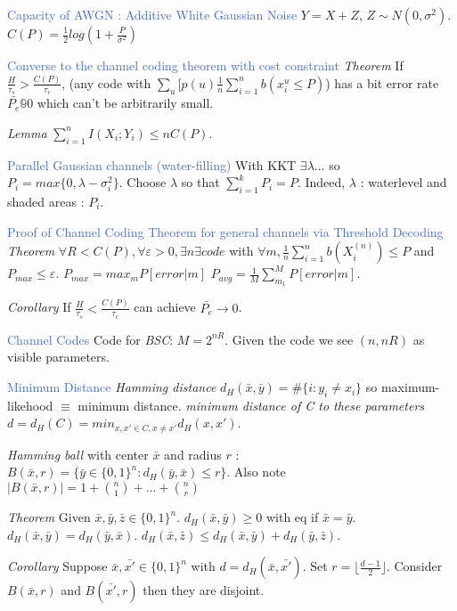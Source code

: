 \documentclass[10pt,a4paper,landscape]{article}
\newcommand{\concept}[1]{\textcolor{RoyalBlue}{#1}}
\newcommand{\subconcept}[1]{\textcolor{PineGreen}{\textit{#1}}}
\renewcommand{\section}[1]{
    \vspace{-0.3cm}
    \begin{center}
      \color{Bittersweet}
      \hrulefill{\small~~#1~~}\hrulefill
    \end{center}
    \vspace{-0.3cm}
  }
\begin{document}
\begin{multicols*}{4}
\concept{Capacity of AWGN : Additive White Gaussian Noise} 
 $Y=X+Z$, $Z\sim N(0,\sigma^2)$.
 $C(P)=\frac{1}{2} log (1+\frac{P}{\sigma^2})$
 
\concept{Converse to the channel coding theorem with cost constraint}
\subconcept{Theorem} If $\frac{H}{\tau_s} > \frac{C(P)}{\tau_c}$, (any code with $\sum_{u} [p(u) \frac{1}{n} \sum_{i=1}^n b(x_{i}^{u} \le P)$) has a bit error rate $\bar{P_e} \mathbb{9} 0$ which can't be arbitrarily small. 

\subconcept{Lemma} $\sum_{i=1}^n I(X_i;Y_i) \le n C(P)$.
 
\concept{Parallel Gaussian channels (water-filling)}
With KKT $\exists \lambda$... so $P_i = max \{0,\lambda-\sigma_{i}^2\}$. Choose $\lambda$ so that $\sum_{i=1}^k P_i = P$. Indeed, $\lambda$ : waterlevel and shaded areas : $P_i$.

\concept{Proof of Channel Coding Theorem for general channels via Threshold Decoding} 
\subconcept{Theorem} $\forall R < C(P), \forall \varepsilon >0, \exists n \exists code$ with $ \forall m, \frac{1}{n} \sum_{i=1}^n b(X_{i}^{(n)}) \le P$ and $P_{max} \le \varepsilon$.
$P_{max}=max_m P[error|m]$
$P_{avg}=\frac{1}{M} \sum_{m_1}^M P[error|m]$.

\subconcept{Corollary} If $\frac{H}{\tau_s}<\frac{C(P)}{\tau_c}$ can achieve $\bar{P_e} \to 0$.

\section{Distances}
\concept{Channel Codes}
Code for \subconcept{BSC}: $M=2^{nR}$.
Given the code we see $(n,n R)$ as visible parameters.
 
\concept{Minimum Distance}
\subconcept{Hamming distance} $d_H(\bar{x},\bar{y})=\#\{i:y_i\neq x_i\}$ so maximum-likehood $\equiv$ minimum distance.
\subconcept{minimum distance of C to these parameters} $d=d_H(C)= min_{x,x' \in C, x \neq x'} d_H(x,x')$.

\subconcept{Hamming ball} with center $\bar{x}$ and radius $r$ :$B(\bar{x},r)=\{\bar{y} \in \{0,1\}^n : d_H(\bar{y},\bar{x}) \le r\}$.
Also note $|B(\bar{x},r)|=1+\binom{n}{1}+...+\binom{n}{r}$

\subconcept{Theorem} Given $\bar{x},\bar{y},\bar{z} \in \{0,1\}^n$.
$d_H(\bar{x},\bar{y}) \ge 0$ with eq if $\bar{x}=\bar{y}$.
$d_H(\bar{x},\bar{y}) = d_H(\bar{y},\bar{x})$.
$d_H(\bar{x},\bar{z}) \le d_H(\bar{x},\bar{y}) + d_H(\bar{y},\bar{z})$.

\subconcept{Corollary} Suppose $\bar{x},\bar{x'} \in \{0,1\}^n$ with $d=d_H(\bar{x},\bar{x'})$. Set $r=\lfloor \frac{d-1}{2} \rfloor$.
Consider $B(\bar{x},r)$ and $B(\bar{x'},r)$ then they are disjoint.


\end{multicols*}
\end{document}
